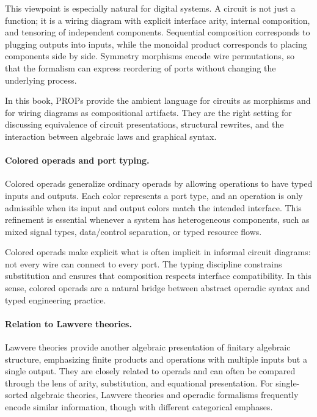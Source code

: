 \documentclass[11pt]{article}
\begin{document}
This viewpoint is especially natural for digital systems. A circuit is not just a function; it is a wiring diagram with explicit interface arity, internal composition, and tensoring of independent components. Sequential composition corresponds to plugging outputs into inputs, while the monoidal product corresponds to placing components side by side. Symmetry morphisms encode wire permutations, so that the formalism can express reordering of ports without changing the underlying process.

In this book, PROPs provide the ambient language for circuits as morphisms and for wiring diagrams as compositional artifacts. They are the right setting for discussing equivalence of circuit presentations, structural rewrites, and the interaction between algebraic laws and graphical syntax.

\paragraph{Colored operads and port typing.}
Colored operads generalize ordinary operads by allowing operations to have typed inputs and outputs. Each color represents a port type, and an operation is only admissible when its input and output colors match the intended interface. This refinement is essential whenever a system has heterogeneous components, such as mixed signal types, data/control separation, or typed resource flows.

Colored operads make explicit what is often implicit in informal circuit diagrams: not every wire can connect to every port. The typing discipline constrains substitution and ensures that composition respects interface compatibility. In this sense, colored operads are a natural bridge between abstract operadic syntax and typed engineering practice.

\paragraph{Relation to Lawvere theories.}
Lawvere theories provide another algebraic presentation of finitary algebraic structure, emphasizing finite products and operations with multiple inputs but a single output. They are closely related to operads and can often be compared through the lens of arity, substitution, and equational presentation. For single-sorted algebraic theories, Lawvere theories and operadic formalisms frequently encode similar information, though with different categorical emphases.
\end{document}

